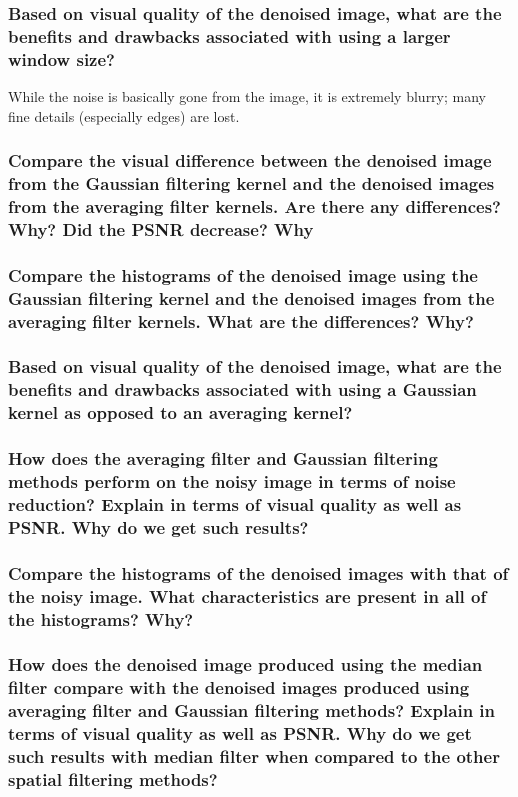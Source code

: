 \documentclass[article, 1.5space, letterpaper, 12pt, oneside, header, footer]{SydeClass}
\begin{document}
\subsubsection{Based on visual quality of the denoised image, what are the benefits and drawbacks associated with
using a larger window size?}
While the noise is basically gone from the image, it is extremely blurry; many fine details (especially edges) are lost.


\subsubsection{Compare the visual difference between the denoised image from the Gaussian filtering kernel and the
denoised images from the averaging filter kernels. Are there any differences? Why? Did the PSNR
decrease? Why}


\subsubsection{Compare the histograms of the denoised image using the Gaussian filtering kernel and the denoised
images from the averaging filter kernels. What are the differences? Why?}


\subsubsection{Based on visual quality of the denoised image, what are the benefits and drawbacks associated with
using a Gaussian kernel as opposed to an averaging kernel?}


\subsubsection{How does the averaging filter and Gaussian filtering methods perform on the noisy image in terms of
noise reduction? Explain in terms of visual quality as well as PSNR. Why do we get such results?}


\subsubsection{Compare the histograms of the denoised images with that of the noisy image. What characteristics
are present in all of the histograms? Why?}


\subsubsection{How does the denoised image produced using the median filter compare with the denoised images
produced using averaging filter and Gaussian filtering methods? Explain in terms of visual quality
as well as PSNR. Why do we get such results with median filter when compared to the other spatial
filtering methods?}
\end{document}
